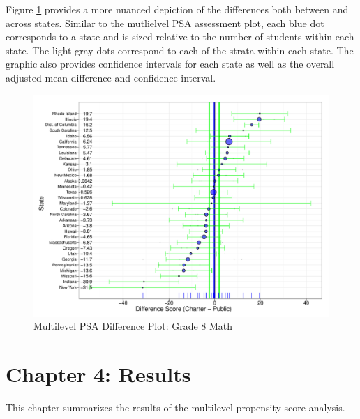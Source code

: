 \documentclass[letterpaper,12p,twoside]{article} %
\begin{document}
Figure \ref{fig:g8math:diff} provides a more nuanced depiction of the differences both between and across states. Similar to the mutlielvel PSA assessment plot, each blue dot corresponds to a state and is sized relative to the number of students within each state. The light gray dots correspond to each of the strata within each state. The graphic also provides confidence intervals for each state as well as the overall adjusted mean difference and confidence interval.

\begin{figure}[tp]
\begin{center}
\includegraphics[height=\textwidth,angle=90]{../Figures/g8mathlrdiffplot.pdf}
\caption{Multilevel PSA Difference Plot: Grade 8 Math}
\label{fig:g8math:diff}
\end{center}
\end{figure}


\cleardoublepage
\section{Chapter 4: Results}

This chapter summarizes the results of the multilevel propensity score analysis. 
\end{document}
